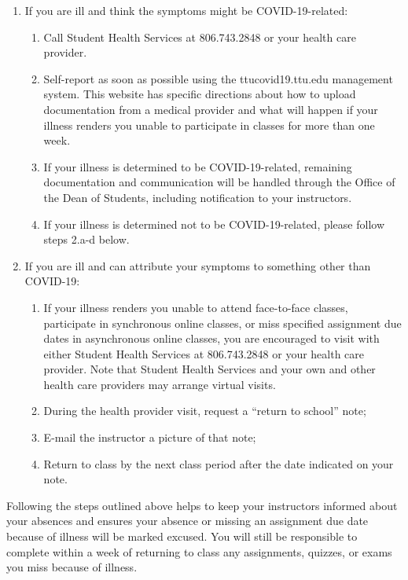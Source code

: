 \documentclass[11pt]{NSF}
\begin{document}
\begin{enumerate}

\item 
If you are ill and think the symptoms might be COVID-19-related:

\begin{enumerate}

\item 
Call Student Health Services at 806.743.2848 or your health care
provider.  

\item
Self-report as soon as possible using the
ttucovid19.ttu.edu management system. 
This website has specific
directions about how to upload documentation from a medical provider
and what will happen if your illness renders you unable to
participate in classes for more than one week.  

\item
If your illness
is determined to be COVID-19-related, remaining documentation and
communication will be handled through the Office of the Dean of
Students, including notification to your instructors.  

\item 
If your illness is determined not to be COVID-19-related, 
please follow steps
2.a-d below.
 
\end{enumerate}

\item
If you are ill and can attribute your symptoms to something other
than COVID-19: 

\begin{enumerate}
\item 
If your illness renders you unable to attend
face-to-face classes, participate in synchronous online classes, or
miss specified assignment due dates in asynchronous online classes,
you are encouraged to visit with either Student Health Services at
806.743.2848 or your health care provider. Note that Student Health
Services and your own and other health care providers may arrange
virtual visits.  

\item During the health provider visit, request a
``return to school” note; 

\item E-mail the instructor a picture of that
note; 

\item Return to class by the next class period after the date
indicated on your note.

\end{enumerate}
\end{enumerate}

Following the steps outlined above helps to keep your instructors
informed about your absences and ensures your absence or missing an
assignment due date because of illness will be marked excused. You
will still be responsible to complete within a week of returning to
class any assignments, quizzes, or exams you miss because of illness.
\end{document}
